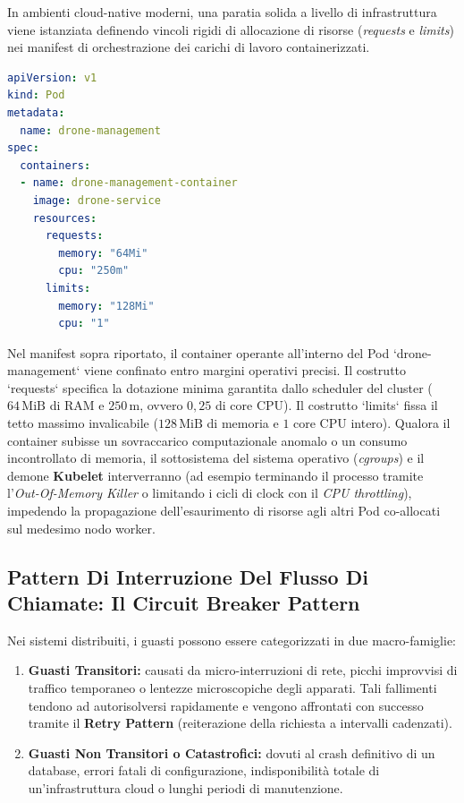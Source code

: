 \documentclass[11pt, a4paper]{article}
\begin{document}
In ambienti cloud-native moderni, una paratia solida a livello di infrastruttura viene istanziata definendo vincoli rigidi di allocazione di risorse (\emph{requests} e \emph{limits}) nei manifest di orchestrazione dei carichi di lavoro containerizzati.

\begin{lstlisting}[language=yaml, caption={Definizione di un Pod Kubernetes con quote vincolate di risorse}]
apiVersion: v1
kind: Pod
metadata:
  name: drone-management
spec:
  containers:
  - name: drone-management-container
    image: drone-service
    resources:
      requests:
        memory: "64Mi"
        cpu: "250m"
      limits:
        memory: "128Mi"
        cpu: "1"
\end{lstlisting}

Nel manifest sopra riportato, il container operante all'interno del Pod `drone-management` viene confinato entro margini operativi precisi. Il costrutto `requests` specifica la dotazione minima garantita dallo scheduler del cluster ($64\,\text{MiB}$ di RAM e $250\,\text{m}$, ovvero $0{,}25$ di core CPU). Il costrutto `limits` fissa il tetto massimo invalicabile ($128\,\text{MiB}$ di memoria e $1$ core CPU intero). Qualora il container subisse un sovraccarico computazionale anomalo o un consumo incontrollato di memoria, il sottosistema del sistema operativo (\emph{cgroups}) e il demone \textbf{Kubelet} interverranno (ad esempio terminando il processo tramite l'\emph{Out-Of-Memory Killer} o limitando i cicli di clock con il \emph{CPU throttling}), impedendo la propagazione dell'esaurimento di risorse agli altri Pod co-allocati sul medesimo nodo worker.

\newpage

\subsection{Pattern Di Interruzione Del Flusso Di Chiamate: Il Circuit Breaker Pattern}

Nei sistemi distribuiti, i guasti possono essere categorizzati in due macro-famiglie:
\begin{enumerate}[noitemsep]
    \item \textbf{Guasti Transitori:} causati da micro-interruzioni di rete, picchi improvvisi di traffico temporaneo o lentezze microscopiche degli apparati. Tali fallimenti tendono ad autorisolversi rapidamente e vengono affrontati con successo tramite il \textbf{Retry Pattern} (reiterazione della richiesta a intervalli cadenzati).
    \item \textbf{Guasti Non Transitori o Catastrofici:} dovuti al crash definitivo di un database, errori fatali di configurazione, indisponibilità totale di un'infrastruttura cloud o lunghi periodi di manutenzione.
\end{enumerate}
\end{document}
